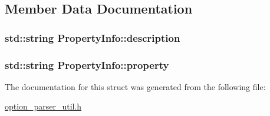 \subsection{Member Data Documentation}
\hypertarget{structPropertyInfo_a40c78026649d233a2d34c48db4d5d98f}{
\subsubsection[{description}]{\setlength{\rightskip}{0pt plus 5cm}std\-::string Property\-Info\-::description}}\label{structPropertyInfo_a40c78026649d233a2d34c48db4d5d98f}
\hypertarget{structPropertyInfo_a28a279d90f3677f67fd81f54ff382421}{
\subsubsection[{property}]{\setlength{\rightskip}{0pt plus 5cm}std\-::string Property\-Info\-::property}}\label{structPropertyInfo_a28a279d90f3677f67fd81f54ff382421}


The documentation for this struct was generated from the following file\-:\begin{DoxyCompactItemize}
\item 
\hyperlink{option__parser__util_8h}{option\-\_\-parser\-\_\-util.\-h}\end{DoxyCompactItemize}
